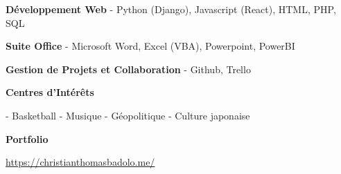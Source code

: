 \documentclass[11pt]{article}
\newcommand{\subsectiontitle}[1]{\noindent\textbf{#1}}
\newcommand{\website}[1]{\href{#1}{#1}}
\begin{document}
\begin{multicols}{2}
\textbf{Développement Web}
- Python (Django), Javascript (React), HTML, PHP, SQL

\textbf{Suite Office}
- Microsoft Word, Excel (VBA), Powerpoint, PowerBI

\textbf{Gestion de Projets et Collaboration}
- Github, Trello

\subsectiontitle{Centres d'Intérêts}

- Basketball
- Musique
- Géopolitique
- Culture japonaise

\subsectiontitle{Portfolio}

\website{https://christianthomasbadolo.me/}

\end{multicols}
\end{document}
